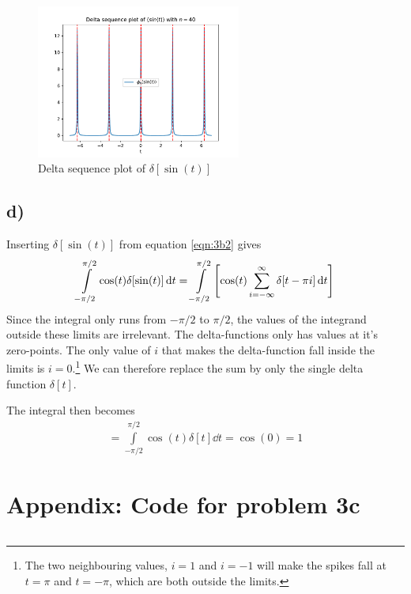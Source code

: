 \documentclass[10pt,a4paper]{article}
\begin{document}
\begin{figure}[H]
    \centering
    \includegraphics[width=0.6\textwidth]{delta_seq_sin.pdf}
    \caption{Delta sequence plot of $\delta[\sin(t)]$}
    \label{fig:2}
\end{figure}



\subsection*{d)}
Inserting $\delta[\sin(t)]$ from equation \ref{eqn:3b2} gives
\begin{align}
    \int\limits_{-\pi/2}^{\pi/2} \cos(t)\delta[\sin(t)]\dd{t} = \int\limits_{-\pi/2}^{\pi/2}\qty[ \cos(t)\sum_{i=-\infty}^{\infty} \delta[t-\pi i] \dd{t} ]
\end{align}
Since the integral only runs from $-\pi/2$ to $\pi/2$, the values of the integrand outside these limits are irrelevant. The delta-functions only has values at it's zero-points. The only value of $i$ that makes the delta-function fall inside the limits is $i=0$.\footnote{The two neighbouring values, $i=1$ and $i=-1$ will make the spikes fall at $t=\pi$ and $t=-\pi$, which are both outside the limits.} We can therefore replace the sum by only the single delta function $\delta[t]$.

The integral then becomes
\begin{align}
    = \int\limits_{-\pi/2}^{\pi/2} \cos(t) \delta[t] \dd{t} = \cos(0) = 1
\end{align}


\pagebreak
\section*{Appendix: Code for problem 3c}
\inputminted[frame=single, fontsize=\footnotesize]{Python}{delta_seq.py}
\end{document}
